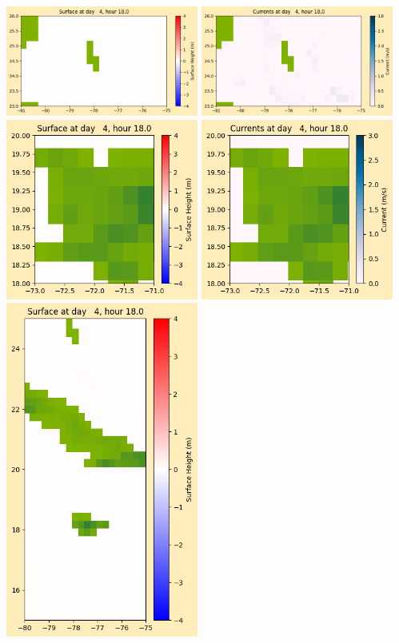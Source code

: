 \documentclass[11pt]{article}
\begin{document}
\vskip 10pt 
\includegraphics[width=0.475\textwidth]{frame0031fig1003.png}
\includegraphics[width=0.475\textwidth]{frame0031fig1004.png}
\vskip 10pt 
\includegraphics[width=0.475\textwidth]{frame0031fig1005.png}
\includegraphics[width=0.475\textwidth]{frame0031fig1006.png}
\vskip 10pt 
\includegraphics[width=0.475\textwidth]{frame0031fig1007.png}
\end{document}
